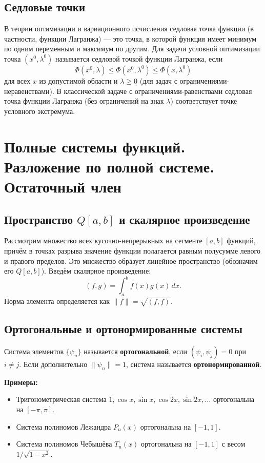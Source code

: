 \documentclass{article}
\theoremstyle{definition}
\begin{document}
\subsection{Седловые точки}
В теории оптимизации и вариационного исчисления седловая точка функции (в частности, функции Лагранжа) — это точка, в которой функция имеет минимум по одним переменным и максимум по другим. Для задачи условной оптимизации точка $(x^0,\lambda^0)$ называется седловой точкой функции Лагранжа, если
\[
\Phi(x^0,\lambda)\le\Phi(x^0,\lambda^0)\le\Phi(x,\lambda^0)
\]
для всех $x$ из допустимой области и $\lambda\ge0$ (для задач с ограничениями-неравенствами). В классической задаче с ограничениями-равенствами седловая точка функции Лагранжа (без ограничений на знак $\lambda$) соответствует точке условного экстремума.

\section{Полные системы функций. Разложение по полной системе. Остаточный член}

\subsection{Пространство $Q[a,b]$ и скалярное произведение}
Рассмотрим множество всех кусочно-непрерывных на сегменте $[a,b]$ функций, причём в точках разрыва значение функции полагается равным полусумме левого и правого пределов. Это множество образует линейное пространство (обозначим его $Q[a,b]$). Введём скалярное произведение:
\[
(f,g)=\int_a^b f(x)g(x)\,dx.
\]
Норма элемента определяется как $\|f\|=\sqrt{(f,f)}$.

\subsection{Ортогональные и ортонормированные системы}
Система элементов $\{\psi_n\}$ называется \textbf{ортогональной}, если $(\psi_i,\psi_j)=0$ при $i\ne j$. Если дополнительно $\|\psi_n\|=1$, система называется \textbf{ортонормированной}.

\textbf{Примеры:}
\begin{itemize}
    \item Тригонометрическая система $1,\cos x,\sin x,\cos 2x,\sin 2x,\dots$ ортогональна на $[-\pi,\pi]$.
    \item Система полиномов Лежандра $P_n(x)$ ортогональна на $[-1,1]$.
    \item Система полиномов Чебышёва $T_n(x)$ ортогональна на $[-1,1]$ с весом $1/\sqrt{1-x^2}$.
\end{itemize}
\end{document}
